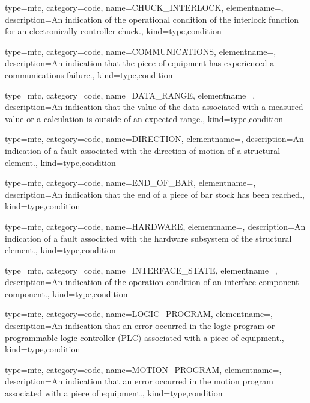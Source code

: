 {
  type=mtc,
  category=code,
  name={CHUCK\_INTERLOCK},
  elementname=,
  description={An indication of the operational condition of the interlock function for an electronically controller chuck.},
  kind={type,condition}
}


{
  type=mtc,
  category=code,
  name={COMMUNICATIONS},
  elementname=,
  description={An indication that the piece of equipment has experienced a communications failure.},
  kind={type,condition}
}


{
  type=mtc,
  category=code,
  name={DATA\_RANGE},
  elementname=,
  description={An indication that the value of the data associated with a measured value or a calculation is outside of an expected range.},
  kind={type,condition}
}


{
  type=mtc,
  category=code,
  name={DIRECTION},
  elementname=,
  description={An indication of a fault associated with the direction of motion of a \gls{structural element}.},
  kind={type,condition}
}


{
  type=mtc,
  category=code,
  name={END\_OF\_BAR},
  elementname=,
  description={An indication that the end of a piece of bar stock has been reached.},
  kind={type,condition}
}


{
  type=mtc,
  category=code,
  name={HARDWARE},
  elementname=,
  description={An indication of a fault associated with the hardware subsystem of the \gls{structural element}.},
  kind={type,condition}
}


{
  type=mtc,
  category=code,
  name={INTERFACE\_STATE},
  elementname=,
  description={An indication of the operation condition of an \gls{interface component} component.},
  kind={type,condition}
}


{
  type=mtc,
  category=code,
  name={LOGIC\_PROGRAM},
  elementname=,
  description={An indication that an error occurred in the logic program or programmable logic controller (PLC) associated with a piece of equipment.},
  kind={type,condition}
}


{
  type=mtc,
  category=code,
  name={MOTION\_PROGRAM},
  elementname=,
  description={An indication that an error occurred in the motion program associated with a piece of equipment.},
  kind={type,condition}
}


